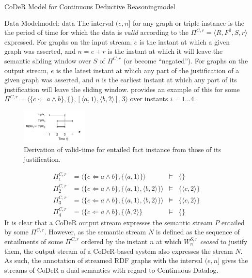 \begin{nestedsection}{CoDeR Model for Continuous Deductive Reasoning}{model}
\begin{nestedsection}{Data Model}{model: data}
		The interval ${(e,n]}$ for any graph or triple instance is the the period of time for which the data is \emph{valid} \citep{SemanticStreamingManagement,sparkwave} according to the ${\Pi^{C,r} = \langle R, F^0, S, r \rangle}$ expressed.
		For graphs on the input stream, $e$ is the instant at which a given graph was asserted, and ${n = e + r}$ is the instant at which it will leave the semantic sliding window over $S$ of $\Pi^{C,r}$ (or become ``negated'').
		For graphs on the output stream, $e$ is the latest instant at which any part of the justification of a given graph was asserted, and $n$ is the earliest instant at which any part of its justification will leave the sliding window.
		 provides an example of this for some ${\Pi^{C,r} = \langle \{c \Leftarrow a \land b\},\{\},[\langle a,1 \rangle,\langle b,2 \rangle ], 3\rangle}$ over instants ${i = 1 \dots 4}$.
		\begin{figure}
			\centering
			\includegraphics[width=0.3\textwidth]{intersected-intervals}
			\caption{Derivation of valid-time for entailed fact instance from those of its justification.}
		\end{figure}
		\begin{align*}
			\Pi^{C,r}_{1} & = \langle \{c \Leftarrow a \land b\}, \{ \langle a, 1 \rangle \} \rangle & \models & \{ \} \\
			\Pi^{C,r}_{2} & = \langle \{c \Leftarrow a \land b\}, \{ \langle a, 1 \rangle, \langle b, 2 \rangle \} \rangle & \models & \{ \langle c, 2 \rangle \} \\
			\Pi^{C,r}_{3} & = \langle \{c \Leftarrow a \land b\}, \{ \langle a, 1 \rangle, \langle b, 2 \rangle \} \rangle & \models & \{ \langle c, 2 \rangle \} \\
			\Pi^{C,r}_{4} & = \langle \{c \Leftarrow a \land b\}, \{ \langle b, 2 \rangle \} & \models & \{ \}
		\end{align*}
		It is clear that a CoDeR output stream expresses the semantic stream $P$ entailed by some $\Pi^{C,r}$.
		However, as the semantic stream $N$ is defined as the sequence of entailments of some $\Pi^{C,r}$ ordered by the instant $n$ at which $W^{S,r}_{n}$ \emph{ceased} to justify them, the output stream of a CoDeR-based system also expresses the stream $N$.
		As such, the annotation of streamed RDF graphs with the interval $(e,n]$ gives the streams of CoDeR a dual semantics with regard to Continuous Datalog.


\end{nestedsection}
\end{nestedsection}
